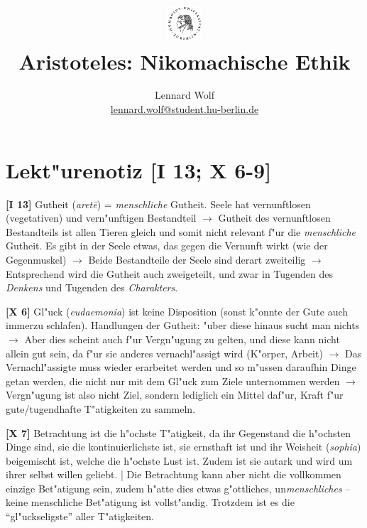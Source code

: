 \documentclass[a4paper]{article}
\date{\vspace{-3ex}}
\begin{document}
\title{
    \vspace{-30pt}
	\includegraphics*[width=0.1\textwidth,left]{ErstesSem/images/hu_logo2.png}\\
	\vspace{-10pt}
	Aristoteles: Nikomachische Ethik}
\author{Lennard Wolf\\
        \small{\href{mailto:lennard.wolf@student.hu-berlin.de}{lennard.wolf@student.hu-berlin.de}}}
\maketitle
\vspace{-4pt}

\section*{Lekt"urenotiz [I 13; X 6-9]}
\large

\textbf{[I 13]} Gutheit (\emph{aret\={e}}) = \emph{menschliche} Gutheit. Seele hat vernunftlosen (vegetativen) und vern"unftigen Bestandteil $\rightarrow$ Gutheit des vernunftlosen Bestandteils ist allen Tieren gleich und somit nicht relevant f"ur die \emph{menschliche} Gutheit. Es gibt in der Seele etwas, das gegen die Vernunft wirkt (wie der Gegenmuskel) $\rightarrow$ Beide Bestandteile der Seele sind derart zweiteilig $\rightarrow$ Entsprechend wird die Gutheit auch zweigeteilt, und zwar in Tugenden des \emph{Denkens} und Tugenden des \emph{Charakters}.\newline

\noindent \textbf{[X 6]} Gl"uck (\emph{eudaemonia}) ist keine Disposition (sonst k"onnte der Gute auch immerzu schlafen). Handlungen der Gutheit: "uber diese hinaus sucht man nichts $\rightarrow$ Aber dies scheint auch f"ur Vergn"ugung zu gelten, und diese kann nicht allein gut sein, da f"ur sie anderes vernachl"assigt wird (K"orper, Arbeit) $\rightarrow$ Das Vernachl"assigte muss wieder erarbeitet werden und so m"ussen daraufhin Dinge getan werden, die nicht nur mit dem Gl"uck zum Ziele unternommen werden $\rightarrow$ Vergn"ugung ist also nicht Ziel, sondern lediglich ein Mittel daf"ur, Kraft f"ur gute/tugendhafte T"atigkeiten zu sammeln. \newline

\noindent \textbf{[X 7]} Betrachtung ist die h"ochste T"atigkeit, da ihr Gegenstand die h"ochsten Dinge sind, sie die kontinuierlichste ist, sie ernsthaft ist und ihr Weisheit (\emph{sophia}) beigemischt ist, welche die h"ochste Lust ist. Zudem ist sie autark und wird um ihrer selbst willen geliebt. | Die Betrachtung kann aber nicht die vollkommen einzige Bet"atigung sein, zudem h"atte dies etwas g"ottliches, un\emph{menschliches} -- keine menschliche Bet"atigung ist vollst"andig. Trotzdem ist es die "`gl"uckseligste"' aller T"atigkeiten.\newline
\end{document}
